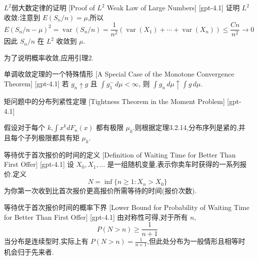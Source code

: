 \documentclass[UTF8]{ctexart}
\begin{document}
    
    
    \begin{prf}
        {$L^2$弱大数定律的证明}
        [Proof of $L^2$ Weak Law of Large Numbers]
        [gpt-4.1]
        证明 $L^2$ 收敛:注意到 $E(S_n / n) = \mu$,所以
\[
E\left(S_n / n - \mu\right)^2 = \operatorname{var}(S_n / n) = \frac{1}{n^2} (\operatorname{var}(X_1) + \cdots + \operatorname{var}(X_n)) \leq \frac{C n}{n^2} \to 0
\]
因此 $S_n / n$ 在 $L^2$ 收敛到 $\mu$.

为了说明概率收敛,应用引理2.
    \end{prf}
    
    
    
    \begin{thm}
        {单调收敛定理的一个特殊情形}
        [A Special Case of the Monotone Convergence Theorem]
        [gpt-4.1]
        若 $g_n \uparrow g$ 且 $\int g_1^{-} \, d\mu < \infty$, 则 $\int g_n \, d\mu \uparrow \int g \, d\mu$.
    \end{thm}
    
    
    
    \begin{thm}
        {矩问题中的分布列紧性定理}
        [Tightness Theorem in the Moment Problem]
        [gpt-4.1]
        
假设对于每个 $k$,$\textstyle{\int x^{k} dF_{n}(x)}$ 都有极限 $\mu_{k}$.则根据定理3.2.14,分布序列是紧的,并且每个子列极限都具有矩 $\mu_{k}$.

    \end{thm}
    
    
    
    \begin{dfn}
        {等待优于首次报价的时间的定义}
        [Definition of Waiting Time for Better Than First Offer]
        [gpt-4.1]
        设 $X_{0}, X_{1}, \ldots$ 是一组随机变量,表示你卖车时获得的一系列报价.定义
\[
N = \inf\{n \geq 1 : X_{n} > X_{0}\}
\]
为你第一次收到比首次报价更高报价所需等待的时间(报价次数).
    \end{dfn}
    
    
    
    \begin{ppt}
        {等待优于首次报价时间的概率下界}
        [Lower Bound for Probability of Waiting Time for Better Than First Offer]
        [gpt-4.1]
        由对称性可得,对于所有 $n$,
\[
P(N > n) \geq \frac{1}{n+1}
\]
当分布是连续型时,实际上有 $P(N > n) = \frac{1}{n+1}$,但此处分布为一般情形且相等时机会归于先来者.
    \end{ppt}
    
\end{document}
